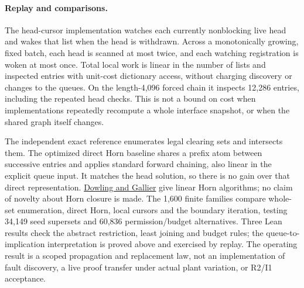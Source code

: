 \documentclass[11pt]{article}
\begin{document}
\paragraph{Replay and comparisons.}
The head-cursor implementation watches each currently nonblocking live head and wakes that list when the head is withdrawn. Across a monotonically growing, fixed batch, each head is scanned at most twice, and each watching registration is woken at most once. Total local work is linear in the number of lists and inspected entries with unit-cost dictionary access, without charging discovery or changes to the queues. On the length-4,096 forced chain it inspects 12,286 entries, including the repeated head checks. This is not a bound on cost when implementations repeatedly recompute a whole interface snapshot, or when the shared graph itself changes.

The independent exact reference enumerates legal clearing sets and intersects them. The optimized direct Horn baseline shares a prefix atom between successive entries and applies standard forward chaining, also linear in the explicit queue input. It matches the head solution, so there is no gain over that direct representation. \href{https://core.ac.uk/download/pdf/82477946.pdf}{Dowling and Gallier} give linear Horn algorithms; no claim of novelty about Horn closure is made. The 1,600 finite families compare whole-set enumeration, direct Horn, local cursors and the boundary iteration, testing 34,149 seed supersets and 60,836 permission/budget alternatives. Three Lean results check the abstract restriction, least joining and budget rules; the queue-to-implication interpretation is proved above and exercised by replay. The operating result is a scoped propagation and replacement law, not an implementation of fault discovery, a live proof transfer under actual plant variation, or R2/I1 acceptance.
\end{document}
